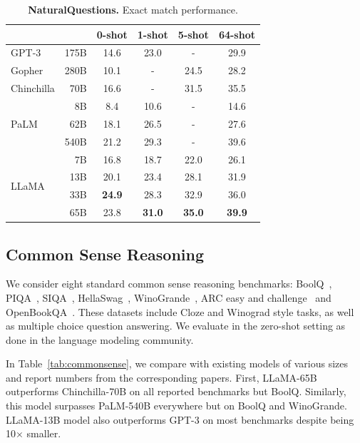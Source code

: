 \documentclass[11pt]{article}
\newcommand{\model}{LLaMA\xspace}
\begin{document}
\begin{table}[h]
  \centering
  \setlength{\tabcolsep}{4pt}

   {
  \begin{tabular}{@{}l@{} r cccc@{}}
    \toprule
           && 0-shot & 1-shot & 5-shot & 64-shot \\
    \midrule
    GPT-3      & 175B & 14.6 & 23.0 & -    & 29.9 \\
    Gopher     & 280B & 10.1 & -    & 24.5 & 28.2 \\
    Chinchilla & 70B  & 16.6 & -    & 31.5 & 35.5 \\
    \midrule
    \multirow{3}{*}{PaLM}
               & 8B   & 8.4  & 10.6 & - & 14.6\\
               & 62B   & 18.1  &26.5 & - & 27.6\\
               & 540B & 21.2 & 29.3 & -    & 39.6\\
    \midrule
    \multirow{4}{*}{\model}
                & 7B   & 16.8 &	18.7 &	22.0 &	26.1 \\
                & 13B  & 20.1 &	23.4 &	28.1 &	31.9 \\
                & 33B  & \bf{24.9} &	28.3 &	32.9 &	36.0 \\
                & 65B  & 23.8 &	\bf{31.0} &	\bf{35.0} &	\bf{39.9} \\
    \bottomrule
  \end{tabular}}
  \caption{
  \textbf{NaturalQuestions.} Exact match performance.
  \label{tab:nqa}
  }
\end{table}

\subsection{Common Sense Reasoning}

We consider eight standard common sense reasoning benchmarks: BoolQ~\citep{clark2019boolq}, PIQA~\citep{bisk2020piqa}, SIQA~\citep{sap2019socialiqa}, HellaSwag~\citep{zellers2019hellaswag}, WinoGrande~\citep{sakaguchi2021winogrande}, ARC easy and challenge~\citep{clark2018think} and OpenBookQA~\citep{mihaylov2018can}.
These datasets include Cloze and Winograd style tasks, as well as multiple choice question answering.
We evaluate in the zero-shot setting as done in the language modeling community.

In Table~\ref{tab:commonsense}, we compare with existing models of various sizes and report numbers from the corresponding papers.
First, \model-65B outperforms Chinchilla-70B on all reported benchmarks but BoolQ.
Similarly, this model surpasses PaLM-540B everywhere but on BoolQ and WinoGrande.
\model-13B model also outperforms GPT-3 on most benchmarks despite being 10$\times$ smaller.
\end{document}
